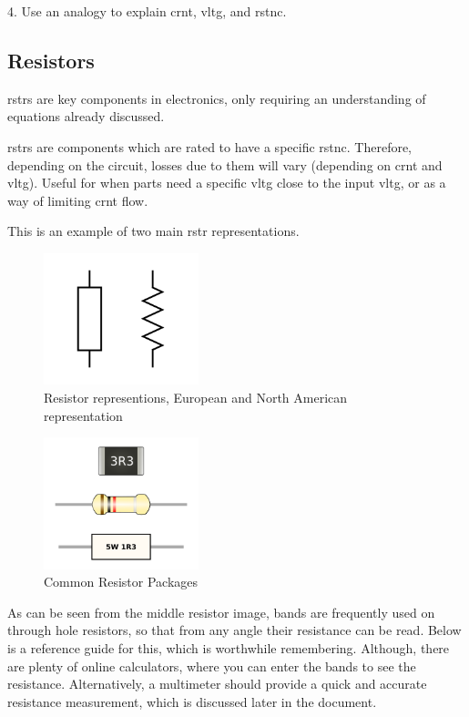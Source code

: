 \documentclass[a4paper,11pt]{report}
\newcommand{\Theory}[1] %
{
\phantomsection %
\todo[inline, color=green!30]{\textbf{#1}} %
\vspace{1em} %
}
\begin{document}
4. Use an analogy to explain \gls{crnt}, \gls{vltg}, and \gls{rstnc}.

\vspace*{1\baselineskip}

\subsection{Resistors}

\Theory{What are \gls{rstr}s?}

\gls{rstr}s are key components in electronics, only requiring an understanding of equations already discussed.

\gls{rstr}s are components which are rated to have a specific \gls{rstnc}. Therefore, depending on the circuit, losses due to them will vary (depending on \gls{crnt} and \gls{vltg}). Useful for when parts need a specific \gls{vltg} close to the input \gls{vltg}, or as a way of limiting \gls{crnt} flow.

This is an example of two main \gls{rstr} representations.

\begin{figure}[H]
\centering
\includegraphics[width=0.4\textwidth]{Resistor1}
\caption{Resistor representions, European and North American representation}
\end{figure}

\begin{figure}[H]
\centering
\includegraphics[width=0.4\textwidth]{ResistorPackages}
\caption{Common Resistor Packages}
\end{figure}

As can be seen from the middle resistor image, bands are frequently used on through hole resistors, so that from any angle their resistance can be read. Below is a reference guide for this, which is worthwhile remembering. Although, there are plenty of online calculators, where you can enter the bands to see the resistance. Alternatively, a multimeter should provide a quick and accurate resistance measurement, which is discussed later in the document.
\end{document}
